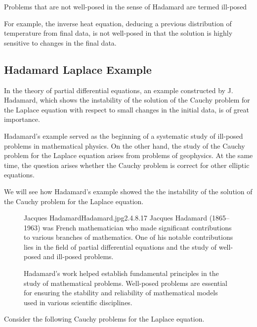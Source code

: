 Problems that are not well-posed in the sense of Hadamard are termed ill-posed

For example, the inverse heat equation, deducing a previous distribution of temperature from final data, is not well-posed in that the solution is highly sensitive to changes in the final data.

\subsection{Hadamard Laplace Example}
In the theory of partial differential equations, an example 
constructed by J. Hadamard, which shows the instability of 
the solution of the Cauchy problem for the Laplace equation 
with respect to small changes in the initial data, is of great importance. 

Hadamard’s example served as the beginning of a 
systematic study of ill-posed problems in mathematical physics. 
On the other hand, the study of the Cauchy problem for 
the Laplace equation arises from problems of geophysics. 
At the same time, the question arises whether the Cauchy problem 
is correct for other elliptic equations. 

We will see how Hadamard’s example showed the the instability of 
the solution of the Cauchy problem for the Laplace equation. 

\begin{figure}[b]
        \begin{enrichment}{Jacques Hadamard}{Hadamard.jpg}{2.4}{.8}{.17}
        Jacques Hadamard (1865–1963) was French mathematician who made significant contributions 
        to various branches of mathematics. One of his notable contributions lies in the field of 
        partial differential equations and the study of well-posed and ill-posed problems.

        Hadamard's work helped establish fundamental principles in the study of mathematical problems. 
        Well-posed problems are essential for ensuring the stability and reliability of mathematical models
         used in various scientific disciplines.
\end{enrichment}
\end{figure}
Consider the following Cauchy problems for the Laplace equation.

